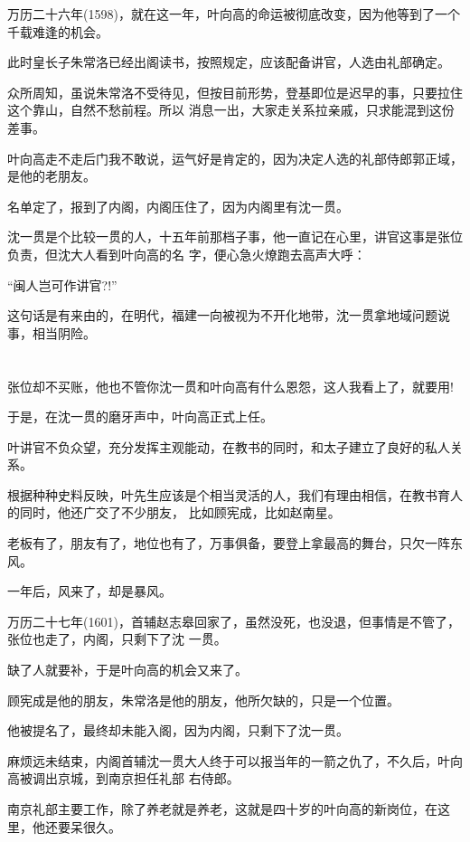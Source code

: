 \documentclass[11pt,a4paper,onecolumn]{article}
\begin{document}
万历二十六年(1598)，就在这一年，叶向高的命运被彻底改变，因为他等到了一个千载难逢的机会。

此时皇长子朱常洛已经出阁读书，按照规定，应该配备讲官，人选由礼部确定。

众所周知，虽说朱常洛不受待见，但按目前形势，登基即位是迟早的事，只要拉住这个靠山，自然不愁前程。所以
消息一出，大家走关系拉亲戚，只求能混到这份差事。

叶向高走不走后门我不敢说，运气好是肯定的，因为决定人选的礼部侍郎郭正域，是他的老朋友。

名单定了，报到了内阁，内阁压住了，因为内阁里有沈一贯。

沈一贯是个比较一贯的人，十五年前那档子事，他一直记在心里，讲官这事是张位负责，但沈大人看到叶向高的名
字，便心急火燎跑去高声大呼：

``闽人岂可作讲官?!''

这句话是有来由的，在明代，福建一向被视为不开化地带，沈一贯拿地域问题说事，相当阴险。

\section[\thesection]{}

张位却不买账，他也不管你沈一贯和叶向高有什么恩怨，这人我看上了，就要用!

于是，在沈一贯的磨牙声中，叶向高正式上任。

叶讲官不负众望，充分发挥主观能动，在教书的同时，和太子建立了良好的私人关系。

根据种种史料反映，叶先生应该是个相当灵活的人，我们有理由相信，在教书育人的同时，他还广交了不少朋友，
比如顾宪成，比如赵南星。

老板有了，朋友有了，地位也有了，万事俱备，要登上拿最高的舞台，只欠一阵东风。

一年后，风来了，却是暴风。

万历二十七年(1601)，首辅赵志皋回家了，虽然没死，也没退，但事情是不管了，张位也走了，内阁，只剩下了沈
一贯。

缺了人就要补，于是叶向高的机会又来了。

顾宪成是他的朋友，朱常洛是他的朋友，他所欠缺的，只是一个位置。

他被提名了，最终却未能入阁，因为内阁，只剩下了沈一贯。

麻烦远未结束，内阁首辅沈一贯大人终于可以报当年的一箭之仇了，不久后，叶向高被调出京城，到南京担任礼部
右侍郎。

南京礼部主要工作，除了养老就是养老，这就是四十岁的叶向高的新岗位，在这里，他还要呆很久。
\end{document}
